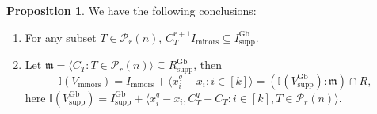 \documentclass[a4paper, 11pt]{amsart}
\newcommand{\mc}[1]{\mathcal{#1}}
\newcommand{\mf}[1]{\mathfrak{#1}}
\newcommand{\mb}[1]{\mathbb{#1}}
\newcommand{\ideala}[1]{\langle{#1}\rangle}
\newcommand{\kh}[1]{\left(#1\right)}
\newcommand{\tx}[1]{\text{#1}}
\theoremstyle{definition}
\newtheorem{proposition}[theorem]{Proposition}
\theoremstyle{definition}
\begin{document}
	
	\begin{proposition}
		We have the following conclusions:
		\begin{enumerate}
			\item For any subset $T\in\mc{P}_r(n)$, $C_T^{r+1}I_{\tx{minors}}\subseteq I^{\tx{Gb}}_{\tx{supp}}$.
			\item Let $\mf{m}=\ideala{C_T:T\in\mc{P}_r(n)}\subseteq R^{\tx{Gb}}_{\tx{supp}}$, then
			\begin{equation*}
				\mb{I}(V_{\tx{minors}})=I_{\tx{minors}}+\ideala{x_i^q-x_i:i\in [k]}=\kh{\mb{I}(V^{\tx{Gb}}_{\tx{supp}}):\mf{m}}\cap R,
			\end{equation*}
			here $\mb{I}(V^{\tx{Gb}}_{\tx{supp}})=I^{\tx{Gb}}_{\tx{supp}}+\ideala{x_i^q-x_i,C_T^q-C_T:i\in[k],T\in\mc{P}_r(n)}$.
		\end{enumerate}
	\end{proposition}
	
\end{document}
